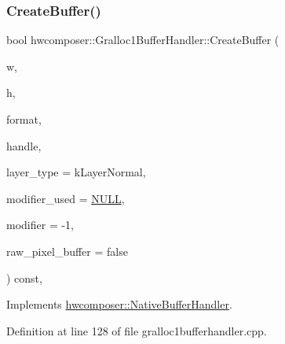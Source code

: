 \subsubsection{\texorpdfstring{Create\+Buffer()}{CreateBuffer()}}
{\footnotesize\ttfamily bool hwcomposer\+::\+Gralloc1\+Buffer\+Handler\+::\+Create\+Buffer (\begin{DoxyParamCaption}\item[{uint32\+\_\+t}]{w,  }\item[{uint32\+\_\+t}]{h,  }\item[{int}]{format,  }\item[{\mbox{\hyperlink{alios_2platformdefines_8h_ac0a2eaf260f556d17fe489911f017bdf}{H\+W\+C\+Native\+Handle}} $\ast$}]{handle,  }\item[{uint32\+\_\+t}]{layer\+\_\+type = {\ttfamily kLayerNormal},  }\item[{bool $\ast$}]{modifier\+\_\+used = {\ttfamily \mbox{\hyperlink{alios_2platformdefines_8h_a070d2ce7b6bb7e5c05602aa8c308d0c4}{N\+U\+LL}}},  }\item[{int64\+\_\+t}]{modifier = {\ttfamily -\/1},  }\item[{bool}]{raw\+\_\+pixel\+\_\+buffer = {\ttfamily false} }\end{DoxyParamCaption}) const\hspace{0.3cm}{\ttfamily [override]}, {\ttfamily [virtual]}}



Implements \mbox{\hyperlink{classhwcomposer_1_1NativeBufferHandler_a7e58e3d81d3f56cbee34c963b4999fde}{hwcomposer\+::\+Native\+Buffer\+Handler}}.



Definition at line 128 of file gralloc1bufferhandler.\+cpp.


